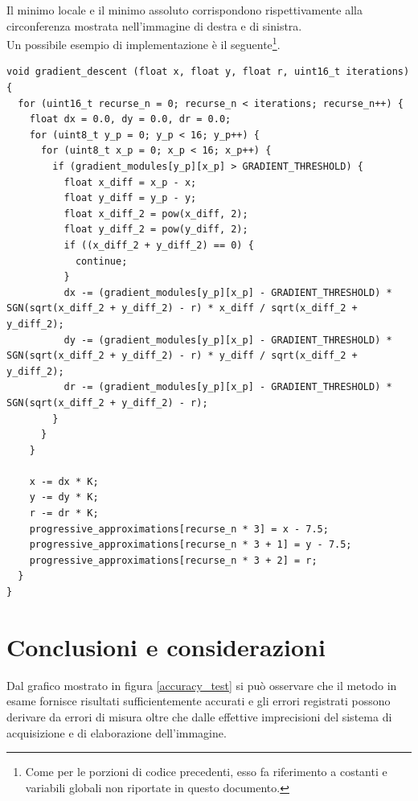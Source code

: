 \documentclass[12pt]{article}
\newenvironment{changemargin}[2]{%
    \begin{list}{}{%
    \setlength{\topsep}{0pt}%
    \setlength{\leftmargin}{#1}%
    \setlength{\rightmargin}{#2}%
    \setlength{\listparindent}{\parindent}%
    \setlength{\itemindent}{\parindent}%
    \setlength{\parsep}{\parskip}%
    }%
    \item[]}{\end{list}}
\begin{document}
        Il minimo locale e il minimo assoluto corrispondono rispettivamente alla circonferenza mostrata nell'immagine di destra e di sinistra.\\

        \newpage
        Un possibile esempio di implementazione è il seguente\footnote{Come per le porzioni di codice precedenti, esso fa riferimento a costanti e variabili globali non riportate in questo documento.}.
        
        \begin{changemargin}{-2cm}{-2cm}
        \begin{lstlisting}[label={list:gradient_descent}, style=Arduino, caption=Ricerca minimi - discesa del gradiente, basicstyle=\scriptsize]
void gradient_descent (float x, float y, float r, uint16_t iterations) {
  for (uint16_t recurse_n = 0; recurse_n < iterations; recurse_n++) {
    float dx = 0.0, dy = 0.0, dr = 0.0;
    for (uint8_t y_p = 0; y_p < 16; y_p++) {
      for (uint8_t x_p = 0; x_p < 16; x_p++) {
        if (gradient_modules[y_p][x_p] > GRADIENT_THRESHOLD) {
          float x_diff = x_p - x;
          float y_diff = y_p - y;
          float x_diff_2 = pow(x_diff, 2);
          float y_diff_2 = pow(y_diff, 2);
          if ((x_diff_2 + y_diff_2) == 0) {
            continue;
          }
          dx -= (gradient_modules[y_p][x_p] - GRADIENT_THRESHOLD) * SGN(sqrt(x_diff_2 + y_diff_2) - r) * x_diff / sqrt(x_diff_2 + y_diff_2);
          dy -= (gradient_modules[y_p][x_p] - GRADIENT_THRESHOLD) * SGN(sqrt(x_diff_2 + y_diff_2) - r) * y_diff / sqrt(x_diff_2 + y_diff_2);
          dr -= (gradient_modules[y_p][x_p] - GRADIENT_THRESHOLD) * SGN(sqrt(x_diff_2 + y_diff_2) - r);
        }
      }
    }

    x -= dx * K;
    y -= dy * K;
    r -= dr * K;
    progressive_approximations[recurse_n * 3] = x - 7.5;
    progressive_approximations[recurse_n * 3 + 1] = y - 7.5;
    progressive_approximations[recurse_n * 3 + 2] = r;
  }
}       \end{lstlisting}
        \end{changemargin}

    \newpage
    \section{Conclusioni e considerazioni}
    Dal grafico mostrato in figura \ref{accuracy_test} si può osservare che il metodo in esame fornisce risultati sufficientemente accurati e gli errori registrati possono derivare da errori di misura oltre che dalle effettive imprecisioni del sistema di acquisizione e di elaborazione dell'immagine.
    
\end{document}
